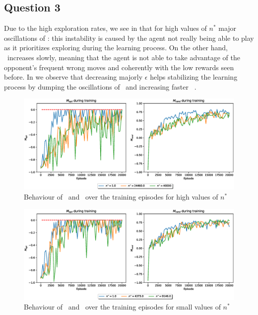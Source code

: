 \documentclass[10pt]{IEEEtran}
\begin{document}
\subsection*{Question 3}
Due to the high exploration rates, we see in  that for high values of $n^{*}$ major oscillations of \mopt: this instability is caused by the agent not really being able to play as it prioritizes exploring during the learning process. On the other hand, \mrand\  increases slowly, meaning that the agent is not able to take advantage of the opponent's frequent wrong moves and coherently with the low rewards seen before. In  we observe that decreasing majorly $\epsilon$ helps stabilizing the learning process by dumping the oscillations of \mopt\  and increasing faster \mrand\ .
\begin{figure}[H]
    \centering
    \includegraphics[width=\linewidth]{code/figures/performance_n_star_first.eps}
    \caption{Behaviour of \mopt\  and \mrand\  over the training episodes for high values of $n^{*}$}
    \label{firstplot_question3}
\end{figure}
\begin{figure}[H]
    \centering
    \includegraphics[width=\linewidth]{code/figures/performance_n_star_second.eps}
    \caption{Behaviour of \mopt\  and \mrand\  over the training episodes for small values of $n^{*}$}
    \label{secondplot_question3}
\end{figure}
\end{document}
